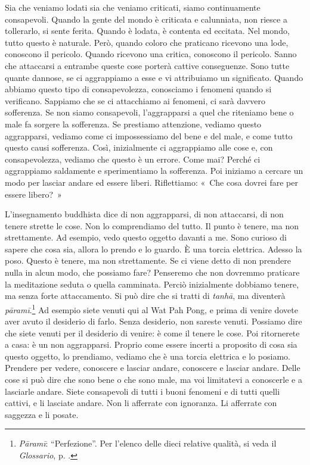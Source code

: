Sia che veniamo lodati sia che veniamo criticati, siamo continuamente
consapevoli. Quando la gente del mondo è criticata e calunniata, non
riesce a tollerarlo, si sente ferita. Quando è lodata, è contenta ed
eccitata. Nel mondo, tutto questo è naturale. Però, quando coloro che
praticano ricevono una lode, conoscono il pericolo. Quando ricevono una
critica, conoscono il pericolo. Sanno che attaccarsi a entrambe queste
cose porterà cattive conseguenze. Sono tutte quante dannose, se ci
aggrappiamo a esse e vi attribuiamo un significato. Quando abbiamo
questo tipo di consapevolezza, conosciamo i fenomeni quando si
verificano. Sappiamo che se ci attacchiamo ai fenomeni, ci sarà davvero
sofferenza. Se non siamo consapevoli, l'aggrapparsi a quel che
riteniamo bene o male fa sorgere la sofferenza. Se prestiamo attenzione,
vediamo questo aggrapparsi, vediamo come ci impossessiamo del bene e del
male, e come tutto questo causi sofferenza. Così, inizialmente ci
aggrappiamo alle cose e, con consapevolezza, vediamo che questo è un
errore. Come mai? Perché ci aggrappiamo saldamente e sperimentiamo la
sofferenza. Poi iniziamo a cercare un modo per lasciar andare ed essere
liberi. Riflettiamo: «~Che cosa dovrei fare per essere libero?~»

L'insegnamento buddhista dice di non aggrapparsi, di non attaccarsi, di
non tenere strette le cose. Non lo comprendiamo del tutto. Il punto è
tenere, ma non strettamente. Ad esempio, vedo questo oggetto davanti a
me. Sono curioso di sapere che cosa sia, allora lo prendo e lo guardo. È
una torcia elettrica. Adesso la poso. Questo è tenere, ma non
strettamente. Se ci viene detto di non prendere nulla in alcun modo, che
possiamo fare? Penseremo che non dovremmo praticare la meditazione
seduta o quella camminata. Perciò inizialmente dobbiamo tenere, ma
senza forte attaccamento. Si può dire che si tratti di \emph{tanhā}, ma
diventerà \emph{pāramī}.\footnote{\emph{Pāramī}: ``Perfezione''. Per
  l'elenco delle dieci relative qualità, si veda il \emph{Glossario}, p. \pageref{glossary-parami}.}
Ad esempio siete venuti qui al Wat Pah Pong, e prima di venire dovete
aver avuto il desiderio di farlo. Senza desiderio, non sareste venuti.
Possiamo dire che siete venuti per il desiderio di venire: è come il
tenere le cose. Poi ritornerete a casa: è un non aggrapparsi. Proprio
come essere incerti a proposito di cosa sia questo oggetto, lo
prendiamo, vediamo che è una torcia elettrica e lo posiamo. Prendere per
vedere, conoscere e lasciar andare, conoscere e lasciar andare. Delle
cose si può dire che sono bene o che sono male, ma voi limitatevi a
conoscerle e a lasciarle andare. Siete consapevoli di tutti i buoni
fenomeni e di tutti quelli cattivi, e li lasciate andare. Non li
afferrate con ignoranza. Li afferrate con saggezza e li posate.

